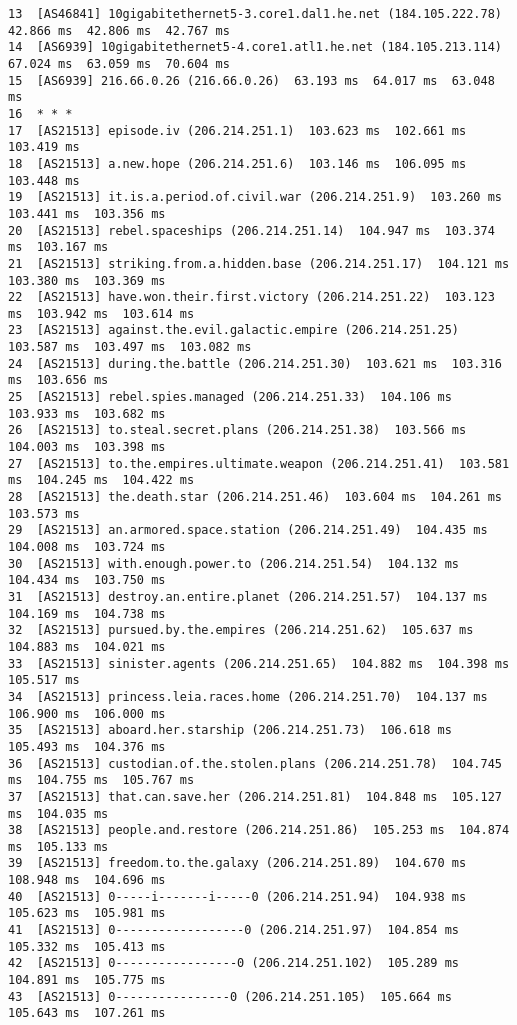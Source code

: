 \documentclass[11pt,fleqn]{article}
\begin{document}
\begin{enumerate}[1.]
\begin{enumerate}[(a)]
{\begin{verbatim}
13  [AS46841] 10gigabitethernet5-3.core1.dal1.he.net (184.105.222.78)  42.866 ms  42.806 ms  42.767 ms
14  [AS6939] 10gigabitethernet5-4.core1.atl1.he.net (184.105.213.114)  67.024 ms  63.059 ms  70.604 ms
15  [AS6939] 216.66.0.26 (216.66.0.26)  63.193 ms  64.017 ms  63.048 ms
16  * * *
17  [AS21513] episode.iv (206.214.251.1)  103.623 ms  102.661 ms  103.419 ms
18  [AS21513] a.new.hope (206.214.251.6)  103.146 ms  106.095 ms  103.448 ms
19  [AS21513] it.is.a.period.of.civil.war (206.214.251.9)  103.260 ms  103.441 ms  103.356 ms
20  [AS21513] rebel.spaceships (206.214.251.14)  104.947 ms  103.374 ms  103.167 ms
21  [AS21513] striking.from.a.hidden.base (206.214.251.17)  104.121 ms  103.380 ms  103.369 ms
22  [AS21513] have.won.their.first.victory (206.214.251.22)  103.123 ms  103.942 ms  103.614 ms
23  [AS21513] against.the.evil.galactic.empire (206.214.251.25)  103.587 ms  103.497 ms  103.082 ms
24  [AS21513] during.the.battle (206.214.251.30)  103.621 ms  103.316 ms  103.656 ms
25  [AS21513] rebel.spies.managed (206.214.251.33)  104.106 ms  103.933 ms  103.682 ms
26  [AS21513] to.steal.secret.plans (206.214.251.38)  103.566 ms  104.003 ms  103.398 ms
27  [AS21513] to.the.empires.ultimate.weapon (206.214.251.41)  103.581 ms  104.245 ms  104.422 ms
28  [AS21513] the.death.star (206.214.251.46)  103.604 ms  104.261 ms  103.573 ms
29  [AS21513] an.armored.space.station (206.214.251.49)  104.435 ms  104.008 ms  103.724 ms
30  [AS21513] with.enough.power.to (206.214.251.54)  104.132 ms  104.434 ms  103.750 ms
31  [AS21513] destroy.an.entire.planet (206.214.251.57)  104.137 ms  104.169 ms  104.738 ms
32  [AS21513] pursued.by.the.empires (206.214.251.62)  105.637 ms  104.883 ms  104.021 ms
33  [AS21513] sinister.agents (206.214.251.65)  104.882 ms  104.398 ms  105.517 ms
34  [AS21513] princess.leia.races.home (206.214.251.70)  104.137 ms  106.900 ms  106.000 ms
35  [AS21513] aboard.her.starship (206.214.251.73)  106.618 ms  105.493 ms  104.376 ms
36  [AS21513] custodian.of.the.stolen.plans (206.214.251.78)  104.745 ms  104.755 ms  105.767 ms
37  [AS21513] that.can.save.her (206.214.251.81)  104.848 ms  105.127 ms  104.035 ms
38  [AS21513] people.and.restore (206.214.251.86)  105.253 ms  104.874 ms  105.133 ms
39  [AS21513] freedom.to.the.galaxy (206.214.251.89)  104.670 ms  108.948 ms  104.696 ms
40  [AS21513] 0-----i-------i-----0 (206.214.251.94)  104.938 ms  105.623 ms  105.981 ms
41  [AS21513] 0------------------0 (206.214.251.97)  104.854 ms  105.332 ms  105.413 ms
42  [AS21513] 0-----------------0 (206.214.251.102)  105.289 ms  104.891 ms  105.775 ms
43  [AS21513] 0----------------0 (206.214.251.105)  105.664 ms  105.643 ms  107.261 ms

\end{verbatim}}
\end{enumerate}
\end{enumerate}
\end{document}
